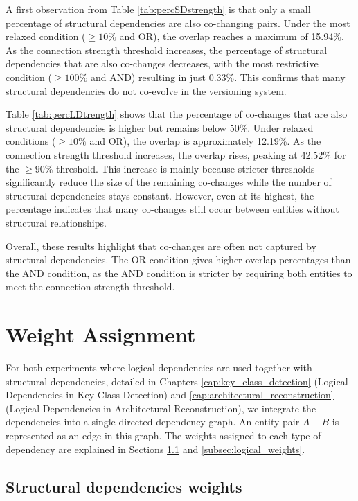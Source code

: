A first observation from Table \ref{tab:percSDstrength} is that only a small percentage of structural dependencies are also co-changing pairs. Under the most relaxed condition (\(\geq 10\%\) and OR), the overlap reaches a maximum of 15.94\%. As the connection strength threshold increases, the percentage of structural dependencies that are also co-changes decreases, with the most restrictive condition (\(\geq 100\%\) and AND) resulting in just 0.33\%. This confirms that many structural dependencies do not co-evolve in the versioning system.

Table \ref{tab:percLDtrength} shows that the percentage of co-changes that are also structural dependencies is higher but remains below 50\%. Under relaxed conditions (\(\geq 10\%\) and OR), the overlap is approximately 12.19\%. As the connection strength threshold increases, the overlap rises, peaking at 42.52\% for the \(\geq 90\%\) threshold. This increase is mainly because stricter thresholds significantly reduce the size of the remaining co-changes while the number of structural dependencies stays constant. However, even at its highest, the percentage indicates that many co-changes still occur between entities without structural relationships.

Overall, these results highlight that co-changes are often not captured by structural dependencies. The OR condition gives higher overlap percentages than the AND condition, as the AND condition is stricter by requiring both entities to meet the connection strength threshold.



\section{Weight Assignment}
\label{sec:weight_assignment}

\hspace{4em}For both experiments where logical dependencies are used together with structural dependencies, detailed in Chapters \ref{cap:key_class_detection} (Logical Dependencies in Key Class Detection) and \ref{cap:architectural_reconstruction} (Logical Dependencies in Architectural Reconstruction), we integrate the dependencies into a single directed dependency graph. An entity pair \( A - B \) is represented as an edge in this graph. The weights assigned to each type of dependency are explained in Sections \ref{subsec:structural_weights} and \ref{subsec:logical_weights}.

\subsection{Structural dependencies weights}
\label{subsec:structural_weights}

